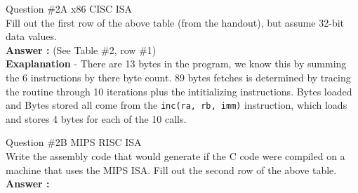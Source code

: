 \documentclass[a4paper,11pt]{article}
\newcommand{\answer}{\textbf{Answer : }}
\begin{document}
 \item Question \#2A x86 CISC ISA \\ Fill out the first row of the above table (from the handout), but assume 32-bit data values. \\
  \answer  (See Table \#2, row \#1) \\
  \textbf{Exaplanation} - There are 13 bytes in the program, we know this by summing the 6 instructions by there byte count. 89 bytes fetches is determined by tracing the routine through 10 iterations plus the intitializing instructions. Bytes loaded and Bytes stored all come from the \texttt{inc(ra, rb, imm)} instruction, which loads and stores 4 bytes for each of the 10 calls. 





 \item Question \#2B MIPS RISC ISA \\ Write the assembly code that would generate if the C code were compiled on a machine that uses the MIPS ISA. Fill out the second row of the above table. \\ \answer \\
\end{document}
